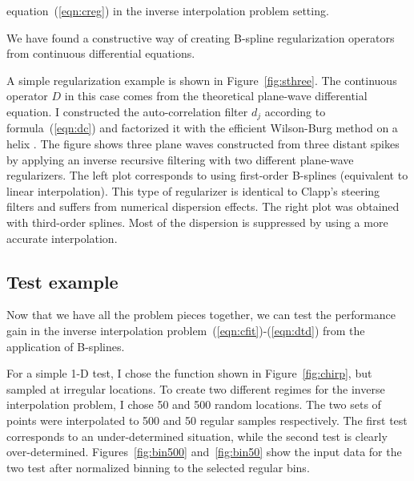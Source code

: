 equation~(\ref{eqn:creg}) in the inverse interpolation problem setting.
\par
We have found a constructive way of creating B-spline regularization
operators from continuous differential equations.
\par
A simple regularization example is shown in Figure~\ref{fig:sthree}.
The continuous operator $D$ in this case comes from the theoretical
plane-wave differential equation.  I constructed the auto-correlation
filter $d_j$ according to formula~(\ref{eqn:dc}) and factorized it
with the efficient Wilson-Burg method on a helix
\cite[]{Sava.sep.97.paul1}. The figure shows three plane waves
constructed from three distant spikes by applying an inverse recursive
filtering with two different plane-wave regularizers. The left plot
corresponds to using first-order B-splines (equivalent to linear
interpolation). This type of regularizer is identical to Clapp's
steering filters \cite[]{Clapp.sep.95.bob1} and suffers from numerical
dispersion effects. The right plot was obtained with third-order
splines. Most of the dispersion is suppressed by using a more accurate
interpolation.


\subsection{Test example}

Now that we have all the problem pieces together, we can test the
performance gain in the inverse interpolation
problem~(\ref{eqn:cfit})-(\ref{eqn:dtd}) from the application of B-splines.
\par
For a simple 1-D test, I chose the function shown in
Figure~\ref{fig:chirp}, but sampled at irregular locations. To create two
different regimes for the inverse interpolation problem, I chose 50
and 500 random locations. The two sets of points were interpolated to
500 and 50 regular samples respectively. The first test corresponds to
an under-determined situation, while the second test is clearly
over-determined. Figures~\ref{fig:bin500} and~\ref{fig:bin50} show the
input data for the two test after normalized binning to the selected
regular bins.


